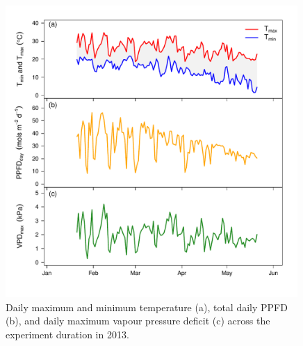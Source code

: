 \documentclass[a4paper]{article}\usepackage[]{graphicx}\usepackage[]{color}
\begin{document}
\begin{figure}[h!]
    \centering
    \includegraphics[width=0.99\textwidth]{airvars.pdf}
    \caption{Daily maximum and minimum temperature (a), total daily PPFD (b), and daily maximum vapour pressure deficit (c) across the experiment duration in 2013.}
    \label{fig:figure 2.2}
\end{figure}
\end{document}
